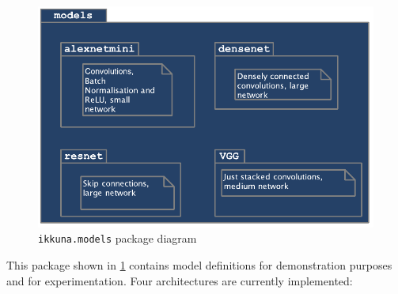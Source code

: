 \begin{figure}
    \hypertarget{fig:pack-diag-models}{%
        \centering
        \includegraphics[max width=.7\textwidth]{gfx/diagrams/class_diagrams/models_package_diagram.pdf}
        \caption{\texttt{ikkuna.models} package diagram}\label{fig:pack-diag-models}
    }
\end{figure}

This package shown in \cref{fig:pack-diag-models} contains model
definitions for demonstration purposes and for experimentation. Four
architectures are currently implemented:

